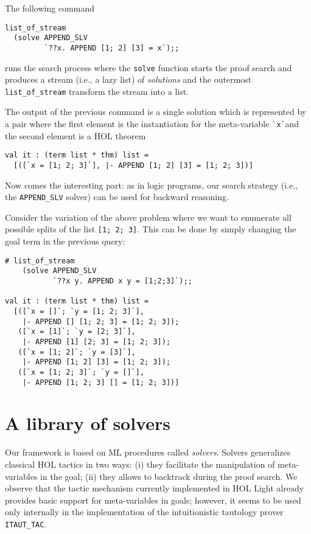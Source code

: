 The following command
\begin{verbatim}
list_of_stream
  (solve APPEND_SLV
         `??x. APPEND [1; 2] [3] = x`);;
\end{verbatim}
runs the search process where the \verb|solve| function starts the
proof search and produces a stream (i.e., a lazy list) of
\emph{solutions} and the outermost \verb|list_of_stream| transform the
stream into a list.

The output of the previous command is a single solution which is
represented by a pair where the first element is the instantiation for
the meta-variable \verb|`x`|and the second element is a HOL theorem
\begin{verbatim}
val it : (term list * thm) list =
  [([`x = [1; 2; 3]`], |- APPEND [1; 2] [3] = [1; 2; 3])]
\end{verbatim}

Now comes the interesting part: as in logic programs, our search
strategy (i.e., the \verb|APPEND_SLV| solver) can be used for backward
reasoning.

Consider the variation of the above problem where we want to enumerate
all possible splits of the list \verb|[1; 2; 3]|.  This can be done by
simply changing the goal term in the previous query:
\begin{verbatim}
# list_of_stream
    (solve APPEND_SLV
           `??x y. APPEND x y = [1;2;3]`);;

val it : (term list * thm) list =
  [([`x = []`; `y = [1; 2; 3]`],
    |- APPEND [] [1; 2; 3] = [1; 2; 3]);
   ([`x = [1]`; `y = [2; 3]`],
    |- APPEND [1] [2; 3] = [1; 2; 3]);
   ([`x = [1; 2]`; `y = [3]`],
    |- APPEND [1; 2] [3] = [1; 2; 3]);
   ([`x = [1; 2; 3]`; `y = []`],
    |- APPEND [1; 2; 3] [] = [1; 2; 3])]
\end{verbatim}

\section{A library of solvers}
\label{sec:library-solvers}

Our framework is based on ML procedures called \emph{solvers}.  Solvers
generalizes classical HOL tactics in two ways: (i) they facilitate the
manipulation of meta-variables in the goal; (ii) they allows to backtrack
during the proof search. We observe that the tactic mechanism currently
implemented in HOL Light already provides basic support for meta-variables in
goals; however, it seems to be used only internally in the implementation of
the intuitionistic tautology prover \texttt{ITAUT\_TAC}. 

